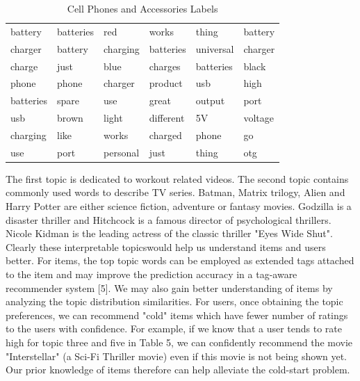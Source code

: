\documentclass[10pt,conference]{IEEEtran}
\begin{document}
\begin{table}[h]
\centering
\caption{Cell Phones and Accessories Labels}
\label{Cell Phones and Accessories Labels}
\begin{tabular}{ llllll }
\toprule
battery & batteries & red   & works  & thing & battery \\
charger & battery & charging & batteries & universal & charger \\
charge & just & blue & charges & batteries & black \\ 
phone & phone & charger & product & usb & high\\ 
batteries & spare & use  & great & output & port \\ 
usb & brown & light & different & 5V & voltage \\ 
charging & like & works & charged & phone & go\\ 
use & port & personal & just & thing & otg \\ 
\toprule          
\end{tabular}
\end{table}

The first topic is dedicated to workout related videos. The second topic contains commonly used words to describe TV series. Batman, Matrix trilogy, Alien and Harry Potter are either science fiction, adventure or fantasy movies. Godzilla is a disaster thriller and Hitchcock is a famous director of psychological thrillers. Nicole Kidman is the leading actress of the classic thriller "Eyes Wide Shut". Clearly these interpretable topicswould help us understand items and users better. For items, the top topic words can be employed as extended tags attached to the item and may improve the prediction accuracy in a tag-aware recommender system [5]. We may also gain better understanding of items by analyzing the topic distribution similarities. For users, once obtaining the topic preferences, we can recommend "cold" items which have fewer number of ratings to the users with confidence. For example, if we know that a user tends to rate high for topic three and five in Table 5, we can confidently recommend the movie "Interstellar" (a Sci-Fi Thriller movie) even if this movie is not being shown yet. Our prior knowledge of items therefore can help alleviate the cold-start problem.



\end{document}
